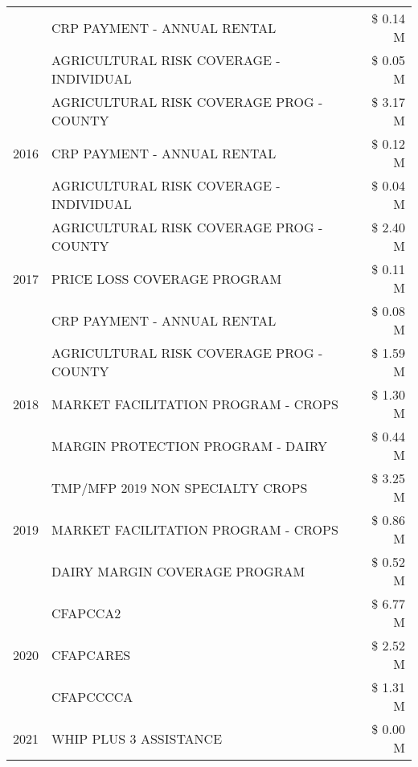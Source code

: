 \begin{tabular}{llr}
 & CRP PAYMENT - ANNUAL RENTAL & \$ 0.14 M \\
 & AGRICULTURAL RISK COVERAGE - INDIVIDUAL & \$ 0.05 M \\
\cline{1-3}
\multirow[t]{3}{*}{2016} & AGRICULTURAL RISK COVERAGE PROG - COUNTY & \$ 3.17 M \\
 & CRP PAYMENT - ANNUAL RENTAL & \$ 0.12 M \\
 & AGRICULTURAL RISK COVERAGE - INDIVIDUAL & \$ 0.04 M \\
\cline{1-3}
\multirow[t]{3}{*}{2017} & AGRICULTURAL RISK COVERAGE PROG - COUNTY & \$ 2.40 M \\
 & PRICE LOSS COVERAGE PROGRAM & \$ 0.11 M \\
 & CRP PAYMENT - ANNUAL RENTAL & \$ 0.08 M \\
\cline{1-3}
\multirow[t]{3}{*}{2018} & AGRICULTURAL RISK COVERAGE PROG - COUNTY & \$ 1.59 M \\
 & MARKET FACILITATION PROGRAM - CROPS & \$ 1.30 M \\
 & MARGIN PROTECTION PROGRAM - DAIRY & \$ 0.44 M \\
\cline{1-3}
\multirow[t]{3}{*}{2019} & TMP/MFP 2019 NON SPECIALTY CROPS & \$ 3.25 M \\
 & MARKET FACILITATION PROGRAM - CROPS & \$ 0.86 M \\
 & DAIRY MARGIN COVERAGE PROGRAM & \$ 0.52 M \\
\cline{1-3}
\multirow[t]{3}{*}{2020} & CFAPCCA2 & \$ 6.77 M \\
 & CFAPCARES & \$ 2.52 M \\
 & CFAPCCCCA & \$ 1.31 M \\
\cline{1-3}
2021 & WHIP PLUS 3 ASSISTANCE & \$ 0.00 M \\
\cline{1-3}
\bottomrule
\end{tabular}
